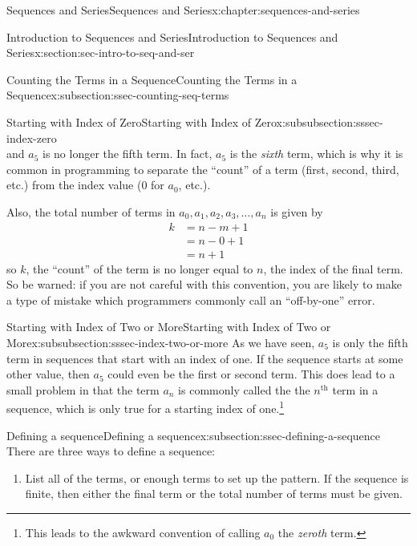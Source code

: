 \documentclass[twoside,10pt,]{book}
\numberwithin{equation}{section}
\newcommand{\nth}{{n^{\text{th}}}}
\newcommand{\amp}{&}
\begin{document}
\begin{chapterptx}{Sequences and Series}{}{Sequences and Series}{}{}{x:chapter:sequences-and-series}
\begin{sectionptx}{Introduction to Sequences and Series}{}{Introduction to Sequences and Series}{}{}{x:section:sec-intro-to-seq-and-ser}
\begin{subsectionptx}{Counting the Terms in a Sequence}{}{Counting the Terms in a Sequence}{}{}{x:subsection:ssec-counting-seq-terms}
\begin{subsubsectionptx}{Starting with Index of Zero}{}{Starting with Index of Zero}{}{}{x:subsubsection:sssec-index-zero}
\begin{equation*}
\end{equation*}
and \(a_5\) is no longer the fifth term.  In fact, \(a_5\) is the \emph{sixth} term, which is why it is common in programming to separate the ``count'' of a term (first, second, third, etc.) from the index value (0 for \(a_0\), etc.).%
\par
Also, the total number of terms in \(a_0, a_1, a_2, a_3, \ldots, a_n\) is given by%
\begin{align*}
k \amp = n - m + 1\\
\amp = n - 0 + 1\\
\amp =n+1
\end{align*}
so \(k\), the ``count'' of the term is no longer equal to \(n\), the index of the final term.  So be warned:  if you are not careful with this convention, you are likely to make a type of mistake which programmers commonly call an ``off-by-one'' error.%
\end{subsubsectionptx}
%
%
\typeout{************************************************}
\typeout{************************************************}
%
\begin{subsubsectionptx}{Starting with Index of Two or More}{}{Starting with Index of Two or More}{}{}{x:subsubsection:sssec-index-two-or-more}
As we have seen, \(a_5\) is only the fifth term in sequences that start with an index of one.  If the sequence starts at some other value, then \(a_5\) could even be the first or second term.  This does lead to a small problem in that the term \(a_n\) is commonly called the the \(\nth{}\) term in a sequence, which is only true for a starting index of one.\footnote{This leads to the awkward convention of calling \(a_0\) the \emph{zeroth} term.\label{g:fn:idp229920600}}%
\end{subsubsectionptx}
\end{subsectionptx}
%
%
\typeout{************************************************}
\typeout{************************************************}
%
\begin{subsectionptx}{Defining a sequence}{}{Defining a sequence}{}{}{x:subsection:ssec-defining-a-sequence}
There are three ways to define a sequence: %
\begin{enumerate}[label=(\alph*)]
\item{}List all of the terms, or enough terms to set up the pattern.  If the sequence is finite, then either the final term or the total number of terms must be given.%

\end{enumerate}
\end{subsectionptx}
\end{sectionptx}
\end{chapterptx}
\end{document}
